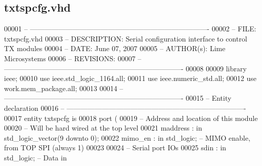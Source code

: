 \subsection{txtspcfg.\+vhd}
\label{txtspcfg_8vhd_source}

\begin{DoxyCode}
00001 \textcolor{keyword}{-- ---------------------------------------------------------------------------- }
00002 \textcolor{keyword}{-- FILE:    txtspcfg.vhd}
00003 \textcolor{keyword}{-- DESCRIPTION: Serial configuration interface to control TX modules}
00004 \textcolor{keyword}{-- DATE:    June 07, 2007}
00005 \textcolor{keyword}{-- AUTHOR(s):   Lime Microsystems}
00006 \textcolor{keyword}{-- REVISIONS:   }
00007 \textcolor{keyword}{-- ---------------------------------------------------------------------------- }
00008 
00009 \textcolor{vhdlkeyword}{library }\textcolor{keywordflow}{ieee};
00010 \textcolor{vhdlkeyword}{use }ieee.std\_logic\_1164.\textcolor{keywordflow}{all};
00011 \textcolor{vhdlkeyword}{use }ieee.numeric\_std.\textcolor{keywordflow}{all};
00012 \textcolor{vhdlkeyword}{use }work.mem_package.\textcolor{keywordflow}{all};
00013 
00014 \textcolor{keyword}{-- ----------------------------------------------------------------------------}
00015 \textcolor{keyword}{-- Entity declaration}
00016 \textcolor{keyword}{-- ----------------------------------------------------------------------------}
00017 \textcolor{keywordflow}{entity }txtspcfg \textcolor{keywordflow}{is}
00018     \textcolor{keywordflow}{port} \textcolor{vhdlchar}{(}
00019 \textcolor{keyword}{        -- Address and location of this module}
00020 \textcolor{keyword}{        -- Will be hard wired at the top level}
00021         \textcolor{vhdlchar}{maddress}    \textcolor{vhdlchar}{:} \textcolor{keywordflow}{in} \textcolor{comment}{std\_logic\_vector}\textcolor{vhdlchar}{(}\textcolor{vhdllogic}{}\textcolor{vhdllogic}{9} \textcolor{keywordflow}{downto} \textcolor{vhdllogic}{}\textcolor{vhdllogic}{0}\textcolor{vhdlchar}{)};
00022         \textcolor{vhdlchar}{mimo_en} \textcolor{vhdlchar}{:} \textcolor{keywordflow}{in} \textcolor{comment}{std\_logic};\textcolor{keyword}{ -- MIMO enable, from TOP SPI (always 1)}
00023     
00024 \textcolor{keyword}{        -- Serial port IOs}
00025         \textcolor{vhdlchar}{sdin}    \textcolor{vhdlchar}{:} \textcolor{keywordflow}{in} \textcolor{comment}{std\_logic};\textcolor{keyword}{     -- Data in}

\end{DoxyCode}

